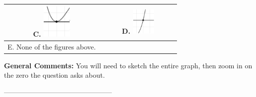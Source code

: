 \documentclass{article}[14pt]
\begin{document}
\begin{tabular}{|c|c|}
 \textbf{C.} \includegraphics[width=0.3\textwidth]{../Figures/zeroBehaviorPositiveEvenA.png} & \textbf{D.} \includegraphics[width=0.3\textwidth]{../Figures/zeroBehaviorPositiveOddA.png} \tabularnewline 
\hline 
 E. None of the figures above. & \tabularnewline 
\hline 
 \end{tabular} 
 
\textbf{General Comments:} You will need to sketch the entire graph, then zoom in on the zero the question asks about.

-----------------------------------------------
\end{document}
